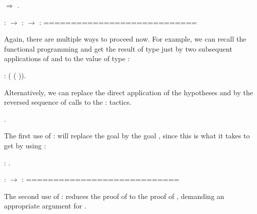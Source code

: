 \begin{coqdoccode}
\coqdocemptyline
\coqdocnoindent
{}\ensuremath{\Rightarrow}   .\coqdoceol
\end{coqdoccode}
\coqdoceol
\coqdocemptyline
\coqdocindent{1.00em}
 :  \ensuremath{\rightarrow} \coqdoceol
\coqdocindent{1.00em}
 :  \ensuremath{\rightarrow} \coqdoceol
\coqdocindent{1.00em}
 : \coqdoceol
\coqdocindent{1.00em}
============================\coqdoceol
\coqdocindent{1.50em}

\coqdocemptyline


Again, there are multiple ways to proceed now. For example, we can
recall the functional programming and get the result of type  just
by two subsequent applications of  and  to the value  of type :


\begin{coqdoccode}
\coqdocemptyline
\coqdocnoindent
{}: ( ( )).\coqdoceol
\coqdocemptyline
\end{coqdoccode}


Alternatively, we can replace the direct application of the hypotheses
 and  by the reversed sequence of calls to the :
tactics.


\begin{coqdoccode}
\coqdocemptyline
\coqdocnoindent
{}.\coqdoceol
\coqdocemptyline
\end{coqdoccode}
\noindent
The first use of : will replace the goal  by the goal ,
since this is what it takes to get  by using :


\begin{coqdoccode}
\coqdocemptyline
\coqdocnoindent
{}: .\coqdoceol
\end{coqdoccode}


\coqdoceol
\coqdocemptyline
\coqdocindent{1.00em}
 :  \ensuremath{\rightarrow} \coqdoceol
\coqdocindent{1.00em}
 : \coqdoceol
\coqdocindent{1.00em}
============================\coqdoceol
\coqdocindent{1.50em}

\coqdocemptyline
\noindent
The second use of : reduces the proof of  to the proof of
, demanding an appropriate argument for .


